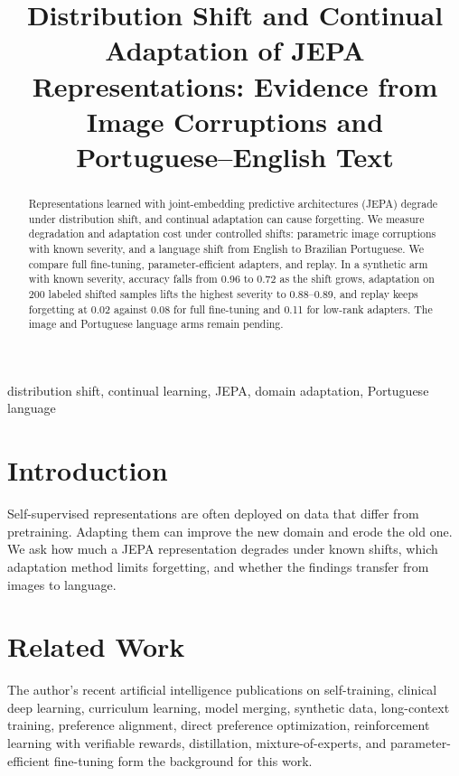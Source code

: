 \documentclass[conference]{IEEEtran}
\begin{document}
\title{Distribution Shift and Continual Adaptation of JEPA Representations: Evidence from Image Corruptions and Portuguese--English Text}

\author{
}

\maketitle

\begin{abstract}
Representations learned with joint-embedding predictive architectures (JEPA) degrade under distribution shift, and continual adaptation can cause forgetting. We measure degradation and adaptation cost under controlled shifts: parametric image corruptions with known severity, and a language shift from English to Brazilian Portuguese. We compare full fine-tuning, parameter-efficient adapters, and replay. In a synthetic arm with known severity, accuracy falls from 0.96 to 0.72 as the shift grows, adaptation on 200 labeled shifted samples lifts the highest severity to 0.88--0.89, and replay keeps forgetting at 0.02 against 0.08 for full fine-tuning and 0.11 for low-rank adapters. The image and Portuguese language arms remain pending.
\end{abstract}

\begin{IEEEkeywords}
distribution shift, continual learning, JEPA, domain adaptation, Portuguese language
\end{IEEEkeywords}

\section{Introduction}
Self-supervised representations are often deployed on data that differ from pretraining. Adapting them can improve the new domain and erode the old one. We ask how much a JEPA representation degrades under known shifts, which adaptation method limits forgetting, and whether the findings transfer from images to language.

\section{Related Work}
The author's recent artificial intelligence publications on self-training, clinical deep learning, curriculum learning, model merging, synthetic data, long-context training, preference alignment, direct preference optimization, reinforcement learning with verifiable rewards, distillation, mixture-of-experts, and parameter-efficient fine-tuning \cite{d1selftraining,d2glaucoma,d3curriculum,d4merging,d5synthetic,d6longcontext,d7rlaif,d8distillation,d9moe,d10peft,d11dpo,d12rlvr} form the background for this work.
\end{document}
